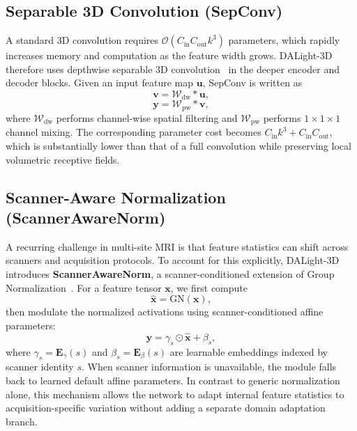 \documentclass[conference]{IEEEtran}
\begin{document}
\subsection{Separable 3D Convolution (SepConv)}
\label{sec:sepconv}

A standard 3D convolution requires $\mathcal{O}(C_{\mathrm{in}} C_{\mathrm{out}} k^3)$ parameters, which rapidly increases memory and computation as the feature width grows. DALight-3D therefore uses depthwise separable 3D convolution~\cite{howard2017mobilenets} in the deeper encoder and decoder blocks. Given an input feature map $\mathbf{u}$, SepConv is written as
\begin{equation}
\mathbf{v} = \mathcal{W}_{\mathrm{dw}} \ast \mathbf{u},
\end{equation}
\begin{equation}
\mathbf{y} = \mathcal{W}_{\mathrm{pw}} \ast \mathbf{v},
\end{equation}
where $\mathcal{W}_{\mathrm{dw}}$ performs channel-wise spatial filtering and $\mathcal{W}_{\mathrm{pw}}$ performs $1\times1\times1$ channel mixing. The corresponding parameter cost becomes $C_{\mathrm{in}}k^3 + C_{\mathrm{in}}C_{\mathrm{out}}$, which is substantially lower than that of a full convolution while preserving local volumetric receptive fields.

\subsection{Scanner-Aware Normalization (ScannerAwareNorm)}
\label{sec:scannorm}

A recurring challenge in multi-site MRI is that feature statistics can shift across scanners and acquisition protocols. To account for this explicitly, DALight-3D introduces \textbf{ScannerAwareNorm}, a scanner-conditioned extension of Group Normalization~\cite{wu2018groupnorm}. For a feature tensor $\mathbf{x}$, we first compute
\begin{equation}
\hat{\mathbf{x}} = \mathrm{GN}(\mathbf{x}),
\end{equation}
then modulate the normalized activations using scanner-conditioned affine parameters:
\begin{equation}
\mathbf{y} = \gamma_s \odot \hat{\mathbf{x}} + \beta_s,
\end{equation}
where $\gamma_s = \mathbf{E}_{\gamma}(s)$ and $\beta_s = \mathbf{E}_{\beta}(s)$ are learnable embeddings indexed by scanner identity $s$. When scanner information is unavailable, the module falls back to learned default affine parameters. In contrast to generic normalization alone, this mechanism allows the network to adapt internal feature statistics to acquisition-specific variation without adding a separate domain adaptation branch.
\end{document}
